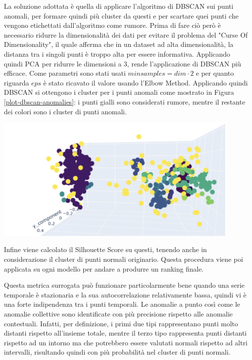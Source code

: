 La soluzione adottata è quella di applicare l'algoritmo di DBSCAN sui punti anomali, per formare quindi più cluster da questi e per scartare quei punti che vengono etichettati dall'algoritmo come rumore.
Prima di fare ciò però è necessario ridurre la dimensionalità dei dati per evitare il problema del "Curse Of Dimensionality", il quale afferma che in un dataset ad alta dimensionalità, la distanza tra i singoli punti è troppo alta per essere informativa.
Applicando quindi PCA per ridurre le dimensioni a 3, rende l'applicazione di DBSCAN più efficace. Come parametri sono stati usati $minsamples=dim \cdot 2$ e per quanto riguarda $eps$ è stato ricavato il valore usando l'Elbow Method.
Applicando quindi DBSCAN si ottengono i cluster per i punti anomali come mostrato in Figura \ref{plot-dbscan-anomalies}: i punti gialli sono considerati rumore, mentre il restante dei colori sono i cluster di punti anomali.

\begin{center}
	\includegraphics[width=12cm, scale=1]{images/plot-dbscan-anomalies}
    \captionsetup{type=figure}
    \label{plot-dbscan-anomalies}
\end{center}

Infine viene calcolato il Silhouette Score su questi, tenendo anche in considerazione il cluster di punti normali originario. Questa procedura viene poi applicata su ogni modello per andare a produrre un ranking finale.

Questa metrica surrogata può funzionare particolarmente bene quando una serie temporale è stazionaria e la sua autocorrelazione relativamente bassa, quindi vi è una forte indipendenza tra i punti temporali. Le anomalie a punto così come le anomalie collettive sono identificate con più precisione rispetto alle anomalie contestuali. Infatti, per definizione, i primi due tipi rappresentano punti molto distanti rispetto all'insieme totale, mentre il terzo tipo rappresenta punti distanti rispetto ad un intorno ma che potrebbero essere valutati normali rispetto ad altri intervalli, risultando quindi con più probabilità nel cluster di punti normali.
